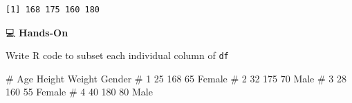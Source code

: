 \documentclass[
  letterpaper,
  DIV=11,
  numbers=noendperiod]{scrreprt}
\newenvironment{Shaded}{\begin{snugshade}}{\end{snugshade}}
\newcommand{\AttributeTok}[1]{\textcolor[rgb]{0.40,0.45,0.13}{#1}}
\newcommand{\CommentTok}[1]{\textcolor[rgb]{0.37,0.37,0.37}{#1}}
\newcommand{\DecValTok}[1]{\textcolor[rgb]{0.68,0.00,0.00}{#1}}
\newcommand{\FunctionTok}[1]{\textcolor[rgb]{0.28,0.35,0.67}{#1}}
\newcommand{\NormalTok}[1]{\textcolor[rgb]{0.00,0.23,0.31}{#1}}
\newcommand{\OtherTok}[1]{\textcolor[rgb]{0.00,0.23,0.31}{#1}}
\newcommand{\SpecialCharTok}[1]{\textcolor[rgb]{0.37,0.37,0.37}{#1}}
\newcommand{\StringTok}[1]{\textcolor[rgb]{0.13,0.47,0.30}{#1}}
\begin{document}
\begin{Shaded}
\end{Shaded}

\begin{verbatim}
[1] 168 175 160 180
\end{verbatim}

💻 \textbf{Hands-On}

Write R code to subset each individual column of \texttt{df}

\begin{Shaded}
\begin{Highlighting}[]
\CommentTok{\#   Age Height Weight Gender}
\CommentTok{\# 1  25    168     65 Female}
\CommentTok{\# 2  32    175     70   Male}
\CommentTok{\# 3  28    160     55 Female}
\CommentTok{\# 4  40    180     80   Male}
\end{Highlighting}
\end{Shaded}
\end{document}
